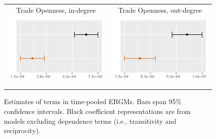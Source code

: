 \documentclass[reqno,onecolumn,letterpaper,12pt]{article}
\begin{document}
\begin{figure}[htp]
\begin{tabular}{c@{\hskip 0cm}c}
Trade Openness, in-degree & Trade Openness, out-degree\\
\includegraphics[height=.2\textheight, clip=true, trim=0cm 0cm 0cm .2cm]{draft_figures/plots_pooled/Trade_in.pdf} &
\includegraphics[height=.2\textheight, clip=true, trim=0cm 0cm 0cm .2cm]{draft_figures/plots_pooled/Trade_out.pdf}   \\
\end{tabular}
\caption{\label{fig:effectPlots4} Estimates of terms in time-pooled ERGMs. Bars span 95\% confidence intervals. Black coefficient representations are from models excluding dependence terms (i.e., transitivity and reciprocity).}
\end{figure}
\end{document}
